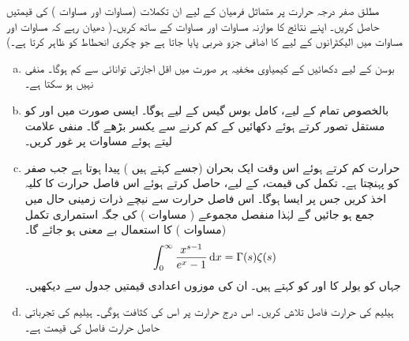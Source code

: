 مطلق صفر درجہ حرارت پر متماثل فرميان کے لیے ان تکملات (مساوات  اور مساوات  ) کی قیمتیں حاصل کریں۔ اپنے نتائج کا موازنہ مساوات  اور مساوات  کے ساتھ کریں۔( دھیان رہے کہ مساوات  اور مساوات  میں الیکٹرانوں کے لیے  کا اضافی جزو ضربی پایا جاتا ہے جو چکری انحطاط کو ظاہر کرتا ہے۔)
\begin{enumerate}[a.]
\item
بوسن کے لیے دکھائیں کے کیمیاوی مخفیہ ہر صورت میں اقل اجازتی توانائی سے کم ہوگا۔   منفی نہیں ہو سکتا ہے۔ 
\item
بالخصوص تمام  کے لیے، کامل بوس گیس کے لیے  ہوگا۔ ایسی صورت میں  اور  کو مستقل تصور کرتے ہوئے دکھائیں کے  کم کرنے سے  یکسر بڑھے گا۔  منفی علامت لیتے ہوئے مساوات  پر غور کریں۔
\item
حرارت  کم کرتے ہوئے اس وقت ایک بحران (جسے  کہتے ہیں ) پیدا ہوتا ہے جب  صفر کو پہنچتا ہے۔ تکمل کی قیمت،  کے لیے، حاصل کرتے ہوئے اس فاصل حرارت کا کلیہ اخذ کریں جس پر ایسا ہوگا۔ اس فاصل حرارت سے نیچے ذرات زمینی حال میں جمع ہو جائیں گے لہٰذا منفصل مجموعے ( مساوات ) کی جگہ استمراری تکمل (مساوات ) کا استعمال بے معنی ہو جائے گا۔  
\begin{align}\label{مساوات_متماثل_گاما_زیٹا}
\int_0^{\infty} \frac{x^{s - 1}}{e^x - 1} \dif x = \Gamma (s) \zeta(s)
\end{align} 
جہاں  کو یولر کا  اور  کو  کہتے ہیں۔ ان کی موزوں اعدادی قیمتیں جدول سے دیکھیں۔ 
\item
ہیلیم  کی حرارت فاصل تلاش کریں۔ اس درج حرارت پر اس کی کثافت  ہوگی۔  ہیلیم کی تجرباتی حاصل حرارت فاصل کی قیمت  ہے۔ 
\end{enumerate}

